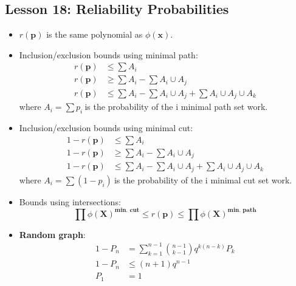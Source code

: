\documentclass[10pt, french]{article}
\begin{document}
\begin{multicols*}{3}
\section*{Lesson 18: Reliability Probabilities}
\begin{itemize}[align=left,leftmargin=*]
    \item $r(\mathbf{p})$ is the same polynomial as $\phi(\mathbf{x})$. 
    \item Inclusion/exclusion bounds using minimal path: 
    \begin{align*}
        r(\mathbf{p}) &\leq \sum A_i \\
        r(\mathbf{p}) &\geq \sum A_i - \sum A_i \cup A_j \\
        r(\mathbf{p}) &\leq \sum A_i - \sum A_i \cup A_j + \sum A_i \cup A_j \cup A_k
    \end{align*} 
    where $A_i=\sum p_i\:$is the probability of the i minimal path set work.  
    \item Inclusion/exclusion bounds using minimal cut: 
    \begin{align*}
        1 - r(\mathbf{p}) &\leq \sum A_i \\
        1 - r(\mathbf{p}) &\geq \sum A_i - \sum A_i \cup A_j \\
        1 - r(\mathbf{p}) &\leq \sum A_i - \sum A_i \cup A_j + \sum A_i \cup A_j \cup A_k
    \end{align*} 
    where $A_i=\sum (1 - p_i)\:$is the probability of the i minimal cut set work.
    \item Bounds using intersections: \[ \prod \phi(\mathbf{X})^{\textbf{min. cut}} \leq r(\mathbf{p}) \leq \prod \phi(\mathbf{X})^{\textbf{min. path}}\]
    \item \textbf{Random graph}:
    \begin{align*}
        1 - P_n &= \sum_{k=1}^{n-1} \binom{n-1}{k-1} q^{k(n-k)} P_k \\
        1 - P_n &\leq (n+1)q^{n-1} \\
        P_1 &= 1
    \end{align*}
\end{itemize}


\end{multicols*}
\end{document}
